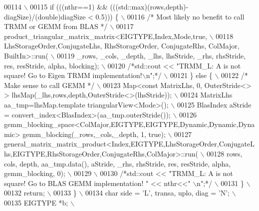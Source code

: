 \begin{DoxyCode}
00114 \textcolor{preprocessor}{\(\backslash\)}
00115 \textcolor{preprocessor}{     if (((nthr==1) && (((std::max)(rows,depth)-diagSize)/(double)diagSize < 0.5))) \{ \(\backslash\)}
00116 \textcolor{preprocessor}{     }\textcolor{comment}{/* Most likely no benefit to call TRMM or GEMM from BLAS */}\textcolor{preprocessor}{ \(\backslash\)}
00117 \textcolor{preprocessor}{       product\_triangular\_matrix\_matrix<EIGTYPE,Index,Mode,true, \(\backslash\)}
00118 \textcolor{preprocessor}{       LhsStorageOrder,ConjugateLhs, RhsStorageOrder, ConjugateRhs, ColMajor, BuiltIn>::run( \(\backslash\)}
00119 \textcolor{preprocessor}{           \_rows, \_cols, \_depth, \_lhs, lhsStride, \_rhs, rhsStride, res, resStride, alpha, blocking); \(\backslash\)}
00120 \textcolor{preprocessor}{     }\textcolor{comment}{/*std::cout << "TRMM\_L: A is not square! Go to Eigen TRMM implementation!\(\backslash\)n";*/}\textcolor{preprocessor}{ \(\backslash\)}
00121 \textcolor{preprocessor}{     \} else \{ \(\backslash\)}
00122 \textcolor{preprocessor}{     }\textcolor{comment}{/* Make sense to call GEMM */}\textcolor{preprocessor}{ \(\backslash\)}
00123 \textcolor{preprocessor}{       Map<const MatrixLhs, 0, OuterStride<> > lhsMap(\_lhs,rows,depth,OuterStride<>(lhsStride)); \(\backslash\)}
00124 \textcolor{preprocessor}{       MatrixLhs aa\_tmp=lhsMap.template triangularView<Mode>(); \(\backslash\)}
00125 \textcolor{preprocessor}{       BlasIndex aStride = convert\_index<BlasIndex>(aa\_tmp.outerStride()); \(\backslash\)}
00126 \textcolor{preprocessor}{       gemm\_blocking\_space<ColMajor,EIGTYPE,EIGTYPE,Dynamic,Dynamic,Dynamic>
       gemm\_blocking(\_rows,\_cols,\_depth, 1, true); \(\backslash\)}
00127 \textcolor{preprocessor}{      
       general\_matrix\_matrix\_product<Index,EIGTYPE,LhsStorageOrder,ConjugateLhs,EIGTYPE,RhsStorageOrder,ConjugateRhs,ColMajor>::run( \(\backslash\)}
00128 \textcolor{preprocessor}{       rows, cols, depth, aa\_tmp.data(), aStride, \_rhs, rhsStride, res, resStride, alpha, gemm\_blocking,
       0); \(\backslash\)}
00129 \textcolor{preprocessor}{\(\backslash\)}
00130 \textcolor{preprocessor}{     }\textcolor{comment}{/*std::cout << "TRMM\_L: A is not square! Go to BLAS GEMM implementation! " << nthr<<" \(\backslash\)n";*/}\textcolor{preprocessor}{ \(\backslash\)}
00131 \textcolor{preprocessor}{     \} \(\backslash\)}
00132 \textcolor{preprocessor}{     return; \(\backslash\)}
00133 \textcolor{preprocessor}{   \} \(\backslash\)}
00134 \textcolor{preprocessor}{   char side = 'L', transa, uplo, diag = 'N'; \(\backslash\)}
00135 \textcolor{preprocessor}{   EIGTYPE *b; \(\backslash\)}

\end{DoxyCode}
